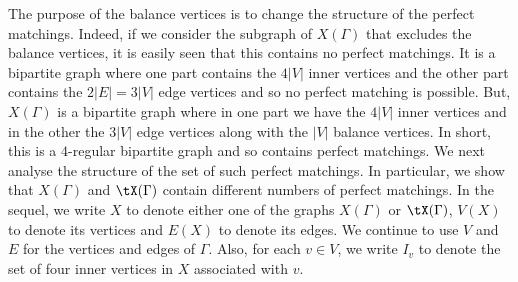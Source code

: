 \documentclass{toc}
\begin{document}
The purpose of the balance vertices is to change the structure of the perfect
matchings. Indeed, if we consider the subgraph of $X(\Gamma)$ that
excludes the balance vertices, it is easily seen that this contains no perfect
matchings. It is a bipartite graph where one part contains the $4|V|$ inner
vertices and the other part contains the $2|E| = 3|V|$ edge vertices and so no
perfect matching is possible. But, $X(\Gamma)$ is a bipartite graph where in one part
we have the $4|V|$ inner vertices and in the other the $3|V|$ edge vertices
along with the $|V|$ balance vertices. In short, this is a $4$-regular bipartite
graph and so contains perfect matchings. We next analyse the structure of the
set of such perfect matchings. In particular, we show that $X(\Gamma)$ and $\tX(\Gamma)$
contain different numbers of perfect matchings.
In the sequel, we write $X$ to denote either one of the graphs $X(\Gamma)$ or
$\tX(\Gamma)$, $V(X)$ to denote its vertices and $E(X)$ to denote its edges. We
continue to use $V$ and $E$ for the vertices and edges of $\Gamma$. Also, for each $v
\in V$, we write $I_v$ to denote the set of four inner vertices in $X$
associated with $v$.
\end{document}
